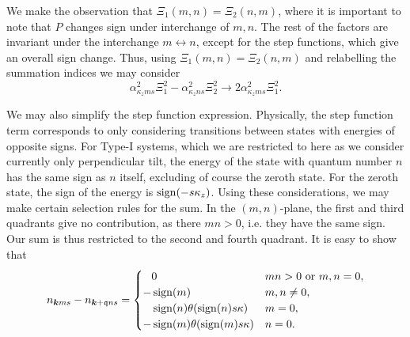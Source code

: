 We make the observation that \( \Xi _1(m, n) = \Xi _2(n, m) \), where it is important to note that \( P \) changes sign under interchange of \( m,n \).
The rest of the factors are invariant under the interchange \( m \leftrightarrow n \), except for the step functions, which give an overall sign change.
Thus, using \( \Xi _1(m, n) = \Xi _2(n, m) \) and relabelling the summation indices we may consider
\[
  \alpha_{\kappa_z m s}^2 \Xi_1^2 - \alpha_{\kappa_z n s}^2\Xi_2^2 \to 2 \alpha_{\kappa_z m s}^2 \Xi_1^2.
\]

We may also simplify the step function expression.
Physically, the step function term corresponds to only considering transitions between states with energies of opposite signs.
For Type-I systems, which we are restricted to here as we consider currently only perpendicular tilt, the energy of the state with quantum number \( n \) has the same sign as \( n \) itself, excluding of course the zeroth state.
For the zeroth state, the sign of the energy is \( \operatorname{sign}(-s \kappa_z) \).
Using these considerations, we may make certain selection rules for the sum.
In the \( (m,n) \)-plane, the first and third quadrants give no contribution, as there \( m n > 0 \), i.e. they have the same sign.
Our sum is thus restricted to the second and fourth quadrant.
It is easy to show that
\begin{equation}
  \label{eq:116}
  n_{\bm{k} m s} - n_{\bm{k} + \mathfrak{q} n s} =
  \begin{cases}
    \phantom{-} 0 & m n > 0 \text{ or  } m,n = 0,\\
    - \operatorname{sign}(m) & m,n \neq 0,\\
    \phantom{-} \operatorname{sign}(n) \theta(\operatorname{sign}(n) s \kappa) & m = 0,\\
    -\operatorname{sign}(m) \theta(\operatorname{sign}(m) s \kappa) & n = 0.
  \end{cases}
\end{equation}

